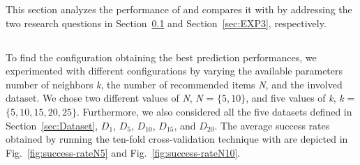 This section analyzes the performance of \TF and compares it with \MNB by addressing the two research questions in Section~\ref{sec:EXP1} and Section~\ref{sec:EXP3}, respectively.



\subsection{\rqfirst} \label{sec:EXP1}
  
To find the configuration obtaining the best prediction performances, we experimented with different \TF configurations by varying the available parameters \ie number of neighbors \emph{k}, the number of recommended items \emph{N}, and the involved dataset.   %
We chose two different values of \emph{N}, \ie \emph{N} = $\{5, 10\}$, and five values of \emph{k}, \ie \emph{k} = $\{5, 10, 15, 20, 25\}$. Furthermore, we also considered all the five datasets defined in Section~\ref{sec:Dataset}, \ie $D_{1}$, $D_{5}$, $D_{10}$, $D_{15}$, and $D_{20}$. The average success rates obtained by running the ten-fold cross-validation technique with \TFa are depicted in Fig.~\ref{fig:success-rateN5} and Fig.~\ref{fig:success-rateN10}.


